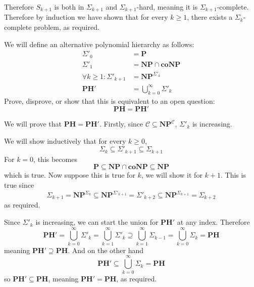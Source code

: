 \documentclass[10pt]{article}
\def\PH{\mathbf{PH}}
\def\P{\mathbf{P}}
\def\NP{\mathbf{NP}}
\def\coNP{\mathbf{coNP}}
\begin{document}
Therefore $S_{k+1}$ is both in $\Sigma_{k+1}$ and $\Sigma_{k+1}$-hard, meaning it is $\Sigma_{k+1}$-complete.
Therefore by induction we have shown that for every $k\geq1$, there exists a $\Sigma_k$-complete problem, as required.

\newpage
\begin{exercise*}

    We will define an alternative polynomial hierarchy as follows:
    \begin{align*}
        \Sigma'_0 &= \P \\
        \Sigma'_1 &= \NP\cap\coNP \\
        \forall k\geq1\colon \Sigma'_{k+1} &= \NP^{\Sigma'_k} \\
        \PH' &= \bigcup_{k=0}^\infty \Sigma'_k
    \end{align*}
    Prove, disprove, or show that this is equivalent to an open question:
    \[ \PH = \PH' \]

\end{exercise*}

We will prove that $\PH=\PH'$.
Firstly, since $\mathcal C\subseteq\NP^{\mathcal C}$, $\Sigma'_k$ is increasing.

We will show inductively that for every $k\geq0$,
\[ \Sigma_k \subseteq \Sigma'_{k+1} \subseteq \Sigma_{k+1} \]
For $k=0$, this becomes
\[ \P \subseteq \NP\cap\coNP \subseteq \NP \]
which is true.
Now suppose this is true for $k$, we will show it for $k+1$.
This is true since
\[ \Sigma_{k+1} = \NP^{\Sigma_k} \subseteq \NP^{\Sigma'_{k+1}} = \Sigma'_{k+2} \subseteq \NP^{\Sigma_{k+1}} = \Sigma_{k+2} \]
as required.

Since $\Sigma'_k$ is increasing, we can start the union for $\PH'$ at any index.
Therefore
\[ \PH' = \bigcup_{k=0}^\infty \Sigma'_k = \bigcup_{k=1}^\infty \Sigma'_k \supseteq \bigcup_{k=1}^\infty \Sigma_{k-1} = \bigcup_{k=0}^\infty \Sigma_k = \PH \]
meaning $\PH'\supseteq\PH$.
And on the other hand
\[ \PH' \subseteq \bigcup_{k=0}^\infty \Sigma_k = \PH \]
so $\PH'\subseteq\PH$, meaning $\PH'=\PH$, as required.
\end{document}
